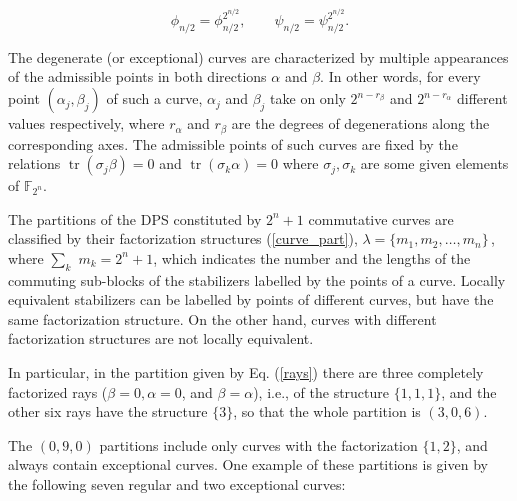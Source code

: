 \documentclass[quantumrep,article,submit,pdftex,moreauthors]{Definitions/mdpi}
\DeclareMathOperator{\tr}{tr}
\providecommand{\DIFaddbegin}{} %
\providecommand{\DIFaddend}{} %
\begin{document}
\DIFaddbegin 

\DIFaddend \begin{equation}
  \phi_{n/2} = \phi_{n/2}^{2^{n/2}},
  \qquad \psi_{n/2} = \psi_{n/2}^{2^{n/2}}.
\end{equation}

The degenerate (or exceptional) curves are characterized by multiple appearances
of the admissible points in both directions $\alpha $ and $\beta$. In other
words, for every point $(\alpha_{j},\beta_{j})$ of such a curve, $\alpha_{j}$
and $\beta_{j}$ take on only $2^{n-r_{\beta}}$ and $2^{n-r_{\alpha}}$ different
values respectively, where $r_{\alpha}$ and $r_{\beta}$ are the degrees of
degenerations along the corresponding axes.  The admissible points of such
curves are fixed by the relations $\tr(\sigma_{j}\beta)=0$ and
$\tr(\sigma_{k}\alpha)=0$ where $\sigma_{j}, \sigma_{k}$ are some given elements
of $\mathbb{F}_{2^{n}}$.

The partitions of the DPS constituted by $2^{n}+1$ commutative curves are
classified by their factorization structures (\ref{curve_part}),
$\lambda=\{m_{1},m_{2},\ldots,m_{n}\}\,$, where $\sum_{k}$ $m_{k}=2^{n}+1$,
which indicates the number and the lengths of the commuting sub-blocks of the
stabilizers labelled by the points of a curve. Locally equivalent stabilizers
can be labelled by points of different curves, but have the same factorization
structure. On the other hand, curves with different factorization structures are
not locally equivalent.

In particular, in the partition given by Eq. (\ref{rays}) there are three
completely factorized rays ($\beta = 0, \alpha = 0$, and $\beta = \alpha$),
i.e., of the structure $\{1,1,1\}$, and the other six rays have the structure
$\{3\}$, so that the whole partition is $(3,0,6)$.

The $(0,9,0)$ partitions include only curves with the factorization $\{1,2\}$,
and always contain exceptional curves. One example of these partitions is given
by the following seven regular and two exceptional curves:
\end{document}
